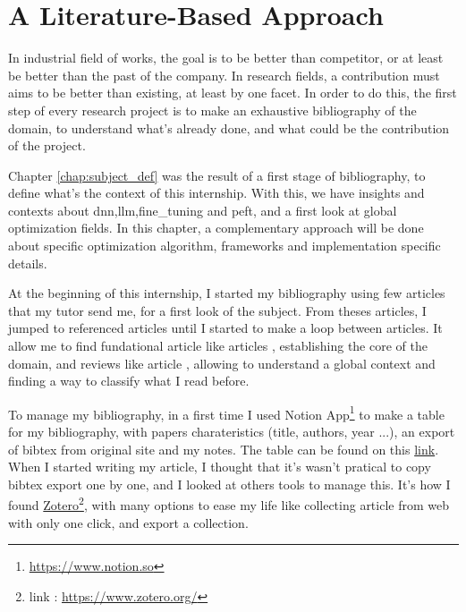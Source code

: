 \section{A Literature-Based Approach}
\label{sec:litterature}
In industrial field of works, the goal is to be better than competitor, or at least be better than the past of the company. In research fields, a contribution must aims to be better than existing, at least by one facet. In order to do this, the first step of every research project is to make an exhaustive bibliography of the domain, to understand what's already done, and what could be the contribution of the project. 

Chapter \ref{chap:subject_def} was the result of a first stage of bibliography, to define what's the context of this internship. With this, we have insights and contexts about \acrshort{dnn},\acrshort{llm},\gls{fine_tuning} and \acrshort{peft}, and a first look at global optimization fields. In this chapter, a complementary approach will be done about specific optimization algorithm, frameworks and implementation specific details. 

At the beginning of this internship, I started my bibliography using few articles that my tutor send me, for a first look of the subject. From theses articles, I jumped to referenced articles until I started to make a loop between articles. It allow me to find fundational article like articles \cite{vaswani_attention_2017,talbi_automated_2021}, establishing the core of the domain, and reviews like article \cite{elsken_neural_2019,talbi_automated_2021}, allowing to understand a global context and finding a way to classify what I read before.

To manage my bibliography, in a first time I used Notion App\footnote{\href{https://www.notion.so}{https://www.notion.so}} to make a table for my bibliography, with papers charateristics (title, authors, year ...), an export of bibtex from original site and my notes. The table can be found on this \href{https://ribbon-crown-5f6.notion.site/6539799af4a24b32b6d4b91c4e07de49?v=b1542338391647aaa38cc8bb4ad1d5d8&pvs=4}{link}. When I started writing my article, I thought that it's wasn't pratical to copy bibtex export one by one, and I looked at others tools to manage this. It's how I found \href{https://www.zotero.org/}{Zotero}\footnote{link : \href{https://www.zotero.org/}{https://www.zotero.org/}}, with many options to ease my life like collecting article from web with only one click, and export a collection.

